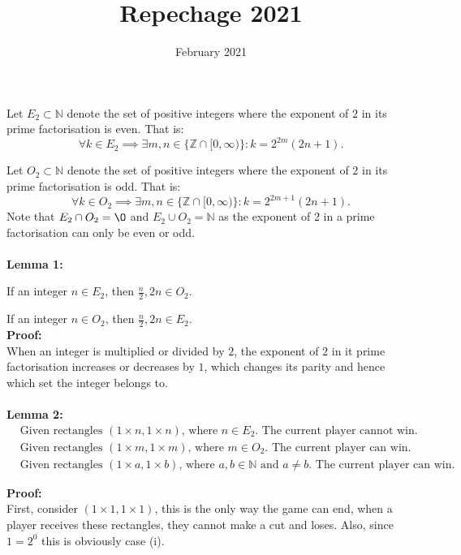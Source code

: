\documentclass{article}
\title{Repechage 2021}
\date{February 2021}
\begin{document}
Let $E_2 \subset \mathbb{N}$ denote the set of positive integers where the exponent of $2$ in its prime factorisation is even. That is:
$$\forall k \in E_2 \implies \exists m,n \in \{ \mathbb{Z} \cap [0, \infty) \} : k = 2^{2m}(2n + 1).$$

Let $O_2 \subset \mathbb{N}$ denote the set of positive integers where the exponent of $2$ in its prime factorisation is odd. That is:
$$\forall k \in O_2 \implies \exists m,n \in \{ \mathbb{Z} \cap [0, \infty) \} : k = 2^{2m + 1}(2n + 1).$$
Note that $E_2 \cap O_2 = \O$ and $E_2 \cup O_2 = \mathbb{N}$ as the exponent of 2 in a prime factorisation can only be even or odd. \\ \\

\textbf{Lemma 1:}
\setlength{\parindent}{15pt} \setlength{\parskip}{5pt}
\par If an integer $n \in E_2$, then $\frac{n}2, 2n \in O_2$. \setlength{\parskip}{0pt}
\par If an integer $n \in O_2$, then $\frac{n}2, 2n \in E_2$. \\

\setlength{\parindent}{0pt}
\textbf{Proof:} \\

When an integer is multiplied or divided by $2$, the exponent of $2$ in it prime factorisation increases or decreases by $1$, which changes its parity and hence which set the integer belongs to. \\ \\

\textbf{Lemma 2:}
\begin{align*}
    &\text{Given rectangles } (1\times n, 1\times n) \text{, where } n \in E_2 \text{. The current player cannot win.} \tag{i} \\
    &\text{Given rectangles } (1\times m, 1\times m) \text{, where } m \in O_2 \text{. The current player can win.} \tag{ii} \\
    &\text{Given rectangles } (1\times a, 1\times b) \text{, where } a,b \in \mathbb{N} \text{ and } a \neq b \text{. The current player can win.} \tag{iii}
\end{align*}


\textbf{Proof:} \\

First, consider $(1 \times 1, 1 \times 1)$, this is the only way the game can end, when a player receives these rectangles, they cannot make a cut and loses. Also, since $1 = 2^0$ this is obviously case (i).\\
\end{document}
